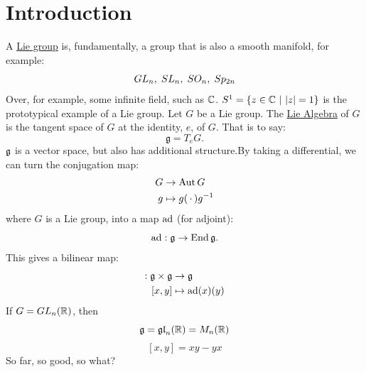 \documentclass{article}
\begin{document}
\section{Introduction}
A \underline{Lie group} is, fundamentally, a group that is also a smooth manifold, for example:
\[ GL_{n}, \hspace{0.1cm} SL_{n}, \hspace{0.1cm} SO_{n}, \hspace{0.1cm} Sp_{2n} \]
Over, for example, some infinite field, such as $\mathbb{C}$.
\ex $S^1 = \{ z \in \mathbb{C} \text{ } | \text{ }{|z| = 1} \}$ is the prototypical example of a Lie group. \gap 
Let $G$ be a Lie group. The \underline{Lie Algebra} of $G$ is the tangent space of $G$ at the identity, $e$, of $G$. That is to say: \[ \mathfrak{g} = T_{e} G. \] $\mathfrak{g}$ is a vector space, but also has additional structure.\gap By taking a differential, we can turn the conjugation map:
\begin{align*}
    G &\to \operatorname{Aut} G\\
    g &\mapsto g (\, \cdot \,) g^{-1}
\end{align*}
where $G$ is a Lie group, into a map $\operatorname{ad}$ (for adjoint):
\[ \operatorname{ad} : \mathfrak{g} \to \operatorname{End} \mathfrak{g}. \] This gives a bilinear map:
\begin{align*}
    [\widecdot, \widecdot] : \frakg \times \frakg &\to \frakg\\
    [x,y] &\mapsto \ad(x)(y)
\end{align*}
\ex If $G=GL_{n}(\mathbb{R})$, then \[ \mathfrak{g} = \mathfrak{gl}_{n}(\mathbb{R}) = M_{n}(\mathbb{R})\] \[ [x,y] = xy-yx \]
So far, so good, so what?
\end{document}
